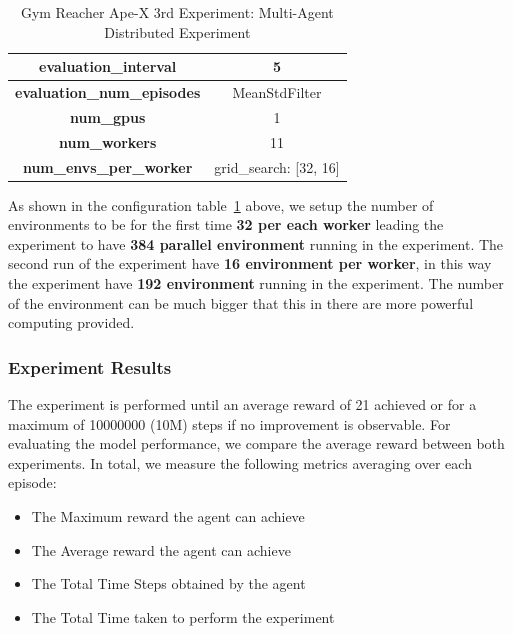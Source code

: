 \begin{table}[!htb]
\begin{tabular}{|c|l|l|c|l|l|}
				\multicolumn{3}{|c|}{\textbf{evaluation\_interval}}                          & \multicolumn{3}{c|}{5}                                             \\ \hline
				\multicolumn{3}{|c|}{\textbf{evaluation\_num\_episodes}}                  & \multicolumn{3}{c|}{MeanStdFilter}                                                  \\ \hline
				\multicolumn{3}{|c|}{\cellcolor[HTML]{C0C0C0}\textbf{num\_gpus}}    & \multicolumn{3}{c|}{\cellcolor[HTML]{C0C0C0}1}                                      \\ \hline
				\multicolumn{3}{|c|}{\cellcolor[HTML]{C0C0C0}\textbf{num\_workers}} & \multicolumn{3}{c|}{\cellcolor[HTML]{C0C0C0}11}                                      \\ \hline
				\multicolumn{3}{|c|}{\cellcolor[HTML]{C0C0C0}\textbf{num\_envs\_per\_worker}} & \multicolumn{3}{c|}{\cellcolor[HTML]{C0C0C0}grid\_search: [32, 16]}                                      \\ \hline
		\end{tabular}
		\caption{Gym Reacher Ape-X 3rd Experiment: Multi-Agent Distributed Experiment}
		\label{tab:gym_reacher_apex_3rd_exp}
\end{table}

As shown in the configuration table~\ref{tab:gym_reacher_apex_3rd_exp} above, we setup the number of environments to be for the first time \textbf{32 per each worker} leading the experiment to have \textbf{384 parallel environment} running in the experiment. The second run of the experiment have \textbf{16 environment per worker}, in this way the experiment have \textbf{192 environment} running in the experiment. The number of the environment can be much bigger that this in there are more powerful computing provided.


\subsubsection{Experiment Results}

The experiment is performed until an average reward of 21 achieved or for a maximum of 10000000 (10M) steps if no improvement is observable. For evaluating the model performance, we compare the average reward between both experiments. In total, we measure the following metrics averaging over each episode:
\begin{itemize}
		\item The Maximum reward the agent can achieve
		\item The Average reward the agent can achieve
		\item The Total Time Steps obtained by the agent
		\item The Total Time taken to perform the experiment
\end{itemize}

